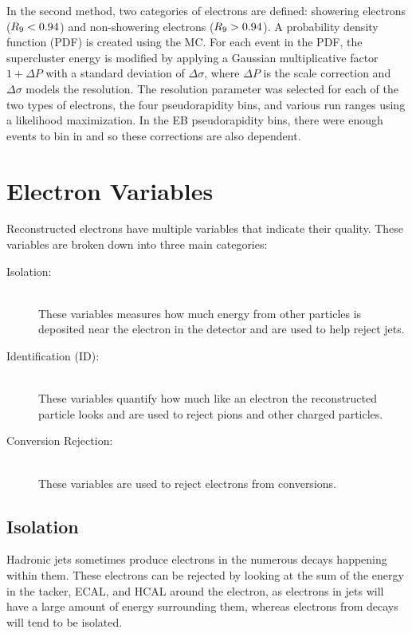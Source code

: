 In the second method, two categories of electrons are defined: showering
electrons ($R_{9} < 0.94$) and non-showering electrons ($R_{9} > 0.94$). A
probability density function (PDF) is created using the \Ztoee MC. For each
event in the PDF, the supercluster energy is modified by applying a Gaussian
multiplicative factor $1+\Delta P$ with a standard deviation of $\Delta \sigma$,
where $\Delta P$ is the scale correction and $\Delta \sigma$ models the
resolution. The resolution parameter was selected for each of the two types of
electrons, the four pseudorapidity bins, and various run ranges using a
likelihood maximization. In the EB pseudorapidity bins, there were enough
events to bin in \ET and so these corrections are also \ET dependent.

\section{Electron Variables}
\label{sec:electron_variables}

Reconstructed electrons have multiple variables that indicate their quality.
These variables are broken down into three main categories:

\begin{description}
    \item[Isolation:] \hfill \\
        These variables measures how much energy from other particles is
        deposited near the electron in the detector and are used to help reject
        jets.
    \item[Identification (ID):] \hfill \\
        These variables quantify how much like an electron the reconstructed
        particle looks and are used to reject pions and other charged
        particles.
    \item[Conversion Rejection:] \hfill \\
        These variables are used to reject electrons from \photontoee
        conversions.
\end{description}

\subsection{Isolation}

Hadronic jets sometimes produce electrons in the numerous decays happening
within them. These electrons can be rejected by looking at the sum of the
energy in the tacker, ECAL, and HCAL around the electron, as electrons in jets
will have a large amount of energy surrounding them, whereas electrons from \Z
decays will tend to be isolated.

